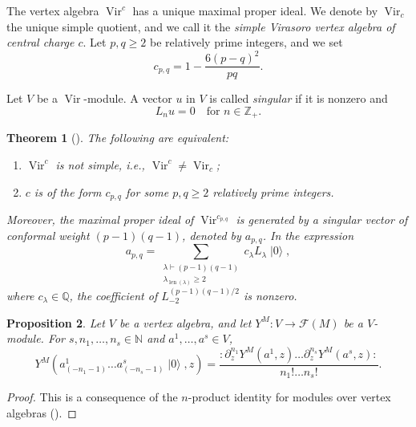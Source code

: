 \documentclass[a4paper, 12pt, reqno]{amsart}
\newtheorem{theorem}{Theorem}[section]
\newtheorem{proposition}[theorem]{Proposition}
\theoremstyle{remark}
\DeclareMathOperator{\Vir}{Vir}
\DeclareMathOperator{\len}{len}
\DeclareMathOperator{\vac}{|0\rangle}
\begin{document}
The vertex algebra $\Vir^c$ has a unique maximal proper ideal.
We denote by $\Vir_c$ the unique simple quotient, and we call it the \emph{simple Virasoro vertex algebra of central charge $c$}.
Let $p, q \ge 2$ be relatively prime integers, and we set
\begin{equation*}
  c_{p, q} = 1 - \frac{6(p - q)^2}{pq}.
\end{equation*}

Let $V$ be a $\Vir$-module.
A vector $u$ in $V$ is called \emph{singular} if it is nonzero and
\begin{equation*}
  L_nu = 0 \quad \text{for $n \in \mathbb{Z}_+$}.
\end{equation*}

\begin{theorem}[{\cite{gorelik_simplicity_2007}}]
  \label{thr:4}
  The following are equivalent:
  \begin{enumerate}
  \item $\Vir^c$ is not simple, i.e., $\Vir^c \neq \Vir_c$;
  \item $c$ is of the form $c_{p, q}$ for some $p, q \ge 2$ relatively prime integers.
  \end{enumerate}
  Moreover, the maximal proper ideal of $\Vir^{c_{p, q}}$ is generated by a singular vector of conformal weight $(p - 1)(q - 1)$, denoted by $a_{p, q}$.
  In the expression
  \begin{equation*}
    a_{p, q} = \sum_{\substack{\lambda \vdash (p - 1)(q - 1) \\ \lambda_{\len(\lambda)} \ge 2}}c_{\lambda}L_{\lambda}\vac,
  \end{equation*}
  where $c_{\lambda} \in \mathbb{Q}$, the coefficient of $L_{-2}^{(p - 1)(q - 1)/2}$ is nonzero.
\end{theorem}

\begin{proposition}
  \label{prp:3}
  Let $V$ be a vertex algebra, and let $Y^M: V \to \mathcal{F}(M)$ be a $V$-module.
  For $s, n_1, \dots, n_s \in \mathbb{N}$ and $a^1, \dots, a^s \in V$,
  \begin{equation*}
    Y^M(a^1_{(-n_1 - 1)}\dots a^s_{(-n_s - 1)}\vac, z) = \frac{:\partial^{n_1}_zY^M(a^1, z)\dots\partial^{n_s}_zY^M(a^s, z):}{n_1!\dots n_s!}.
  \end{equation*}
\end{proposition}

\begin{proof}
  This is a consequence of the $n$-product identity for modules over vertex algebras (\cite[(5.2.16)]{lepowsky_introduction_2004}).
\end{proof}
\end{document}
